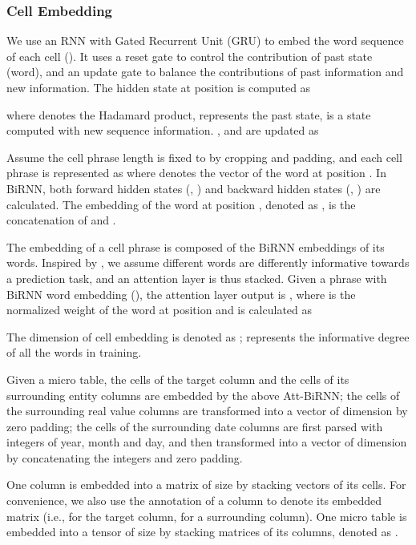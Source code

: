 \documentclass{article}
\begin{document}
\subsubsection{Cell Embedding}
We use an RNN with Gated Recurrent Unit (GRU) \cite{bhagavatula2015tabel} to embed the word sequence of each cell ().
It uses 
a reset gate  to control the contribution of past state (word), 
and an update gate  to balance the contributions of past information and new information.
The hidden state at position  is computed as

where  denotes the Hadamard product, 
 represents the past state,
 is a state computed with new sequence information.
,  and  are updated as
\vspace{-0.1cm}


Assume the cell phrase length is fixed to  by cropping and padding,
and each cell phrase is represented as  where  denotes the vector of the word at position .
In BiRNN, 
both forward hidden states (, ) and
backward hidden states (, ) are calculated.
The embedding of the word at position , denoted as , 
is the concatenation of  and .

The embedding of a cell phrase is composed of the BiRNN embeddings of its words.
Inspired by \cite{yang2016hierarchical}, 
we assume different words are differently informative towards a prediction task,
and an attention layer is thus stacked.
Given a phrase with BiRNN word embedding  (), 
the attention layer output is
, where  is the normalized weight of the word at position  and is calculated as 
\vspace{-0.1cm}

The dimension of cell embedding  is denoted as ;
 represents the informative degree of all the words in training.

Given a micro table, the cells of the target column and the cells of its surrounding entity columns are embedded by the above Att-BiRNN;
the cells of the surrounding real value columns are transformed into a vector of dimension  by zero padding;
the cells of the surrounding date columns are first parsed with integers of year, month and day,
and then transformed into a vector of dimension  by concatenating the integers and zero padding.


One column is embedded into a matrix of size  by stacking vectors of its cells.
For convenience, we also use the annotation of a column 
to denote its embedded matrix (i.e.,  for the target column,  for a surrounding column).
One micro table is embedded into a tensor of size  by stacking matrices of its columns, denoted as .
\end{document}
